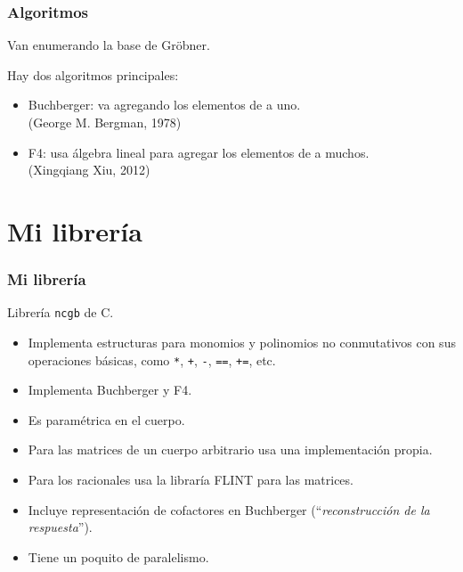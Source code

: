 \documentclass[spanish, aspectratio=169, hidecontrols]{beamer}
\newcommand\cpp{C\nolinebreak[4]\hspace{-.05em}\raisebox{.4ex}{\relsize{-3}{\textbf{++}}}\xspace}
\begin{document}
\begin{frame}
  \frametitle{Algoritmos}

  Van enumerando la base de Gröbner.

  \pause
  Hay dos algoritmos principales:
  \begin{itemize}
    \item Buchberger: va agregando los elementos de a uno.\\
    (George M. Bergman, 1978)
    \item F4: usa álgebra lineal para agregar los elementos de a muchos.\\
    (Xingqiang Xiu, 2012)
  \end{itemize}
\end{frame}

\section{Mi librería}

\begin{frame}
  \frametitle{Mi librería}
  Librería \texttt{ncgb} de \cpp.
  \pause
  \begin{itemize}
    \item Implementa estructuras para monomios y polinomios no conmutativos con sus operaciones básicas, como \texttt{*}, \texttt{+}, \texttt{-}, \texttt{==}, \texttt{+=}, etc.
    \pause
    \item Implementa Buchberger y F4.
    \pause
    \item Es \alert{paramétrica en el cuerpo}.
    \pause
    \item Para las matrices de un cuerpo arbitrario usa una implementación propia.
    \pause
    \item Para los racionales usa la libraría FLINT para las matrices. %
    \pause
    \item Incluye \alert{representación de cofactores} en Buchberger (``\textit{reconstrucción de la respuesta}'').
    \pause
    \item Tiene un poquito de paralelismo.
  \end{itemize}
\end{frame}
\end{document}
